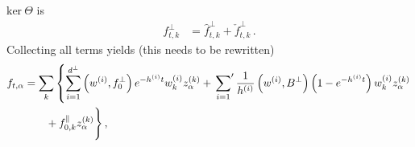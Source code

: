 \documentclass[11pt]{article}
\begin{document}
$\text{ker}\ \Theta$ is 
\begin{align}
    f^\perp_{t,k} 
    \label{eq:FlowSolution}
        &= \hat{f}^\perp_{t,k} + \check{f}^\perp_{t,k} 
        \, .
\end{align}
Collecting all terms yields (this needs to be rewritten)
\begin{align}
    f_{t,\alpha} 
    &= \sum_{k} \left\{\sum_{i=1}^{d^\perp}  
        \left(w^{(i)}, f^\perp_0\right) e^{-h^{(i)}t} w^{(i)}_k z^{(k)}_\alpha
    + \sideset{}{'}\sum_{i=1}  \frac{1}{h^{(i)}} \left(w^{(i)}, B^\perp\right)
        \left(1 - e^{-h^{(i)}t}\right) w^{(i)}_k z^{(k)}_\alpha \right.\nonumber \\
        \label{eq:AnalyticSol}
    & \quad\quad + f^\parallel_{0,k} z^{(k)}_\alpha \Bigg\}\, ,
\end{align}



\end{document}

